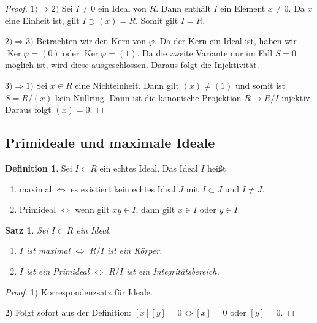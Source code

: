\documentclass[reqno,12pt]{article}
\numberwithin{equation}{section}
\newcommand{\Ker}{\text{Ker }}
\theoremstyle{plain}
\newtheorem{proposition}[thm]{Satz}
\theoremstyle{definition}
\newtheorem{definition}[thm]{Definition}
\renewcommand{\Ker}{\operatorname{Ker}}
\begin{document}
\begin{proof}
  $1) \Rightarrow 2)$ Sei $I \neq 0$ ein Ideal von $R$. Dann enthält $I$ ein Element $x \neq 0$. Da $x$ eine Einheit ist, gilt $I \supset (x) = R$. Somit gilt $I=R$.

\smallskip

  $2) \Rightarrow 3)$ Betrachten wir den Kern von $\varphi$. Da der Kern ein Ideal ist, haben wir $\Ker \varphi = (0)$ oder $\Ker \varphi = (1)$. Da die zweite Variante nur im Fall $S=0$ möglich ist, wird diese ausgeschlossen. Daraus folgt die Injektivität.

\smallskip

  $3) \Rightarrow 1)$ Sei $x \in R$ eine Nichteinheit. Dann gilt $(x) \neq (1)$ und somit ist $S=R/(x)$ kein Nullring. Dann ist die kanonische Projektion $R \to R/I$ injektiv. Daraus folgt $(x)=0$.
\end{proof}



\subsection{Primideale und maximale Ideale}

\begin{definition}
Sei $I \subset R$ ein echtes Ideal. Das Ideal $I$ heißt
\begin{enumerate}
  \item {\sf maximal} $\iff$ es existiert kein echtes Ideal $J$ mit $I \subset J$ und $I \neq J$.
  \item {\sf Primideal} $\iff$ wenn gilt $xy \in I$, dann gilt $x \in I$ oder $y \in I$.
\end{enumerate}
\end{definition}

\begin{proposition}\label{satz-characterisation-of-maxima/prime-ideals}
Sei $I \subset R$ ein Ideal.
\begin{enumerate}
  \item $I$ ist maximal $\iff$ $R/I$ ist ein Körper.
  \item $I$ ist ein Primideal $\iff$ $R/I$ ist ein Integritätsbereich.
\end{enumerate}
\end{proposition}

\begin{proof}
1)  Korrespondenzsatz für Ideale.

\smallskip

2) Folgt sofort aus der Definition: $[x][y]=0 \iff [x]=0 \text{ oder } [y]=0$.
\end{proof}
\end{document}
